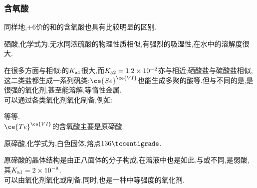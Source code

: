 \documentclass{ctexart}
\begin{document}
\subsubsection{含氧酸}
同样地,$+6$价的和的含氧酸也具有比较明显的区别.
\begin{substance}[\ce{H2SeO4}]
    硒酸,化学式为.无水同浓硫酸的物理性质相似,有强烈的吸湿性,在水中的溶解度很大.
\end{substance}
在很多方面与相似:的$K_{\text a1}$很大,而$K_{\text a2}=1.2\times10^{-2}$亦与相近;硒酸盐与硫酸盐相似,这二类盐都生成一系列矾类;$\ce{Se}^{\ce{VI}}$也能生成多聚的酸等.但与不同的是,是很强的氧化剂,甚至能溶解,等惰性金属.\\
\indent 可以通过各类氧化剂氧化制备,例如:
\begin{center}
\end{center}
等等.\\
\indent $\ce{Te}^{\ce{VI}}$的含氧酸主要是原碲酸.
\begin{substance}[\ce{H6TeO6}]
    原碲酸,化学式为,白色固体,熔点$136\tccentigrade$.
\end{substance}
原碲酸的晶体结构是由正八面体的分子构成,在溶液中也是如此.与或不同,是弱酸,其$K_{\text a1}=2\times10^{-8}$.\\
\indent {}可以由氧化剂氧化或制备.同时,也是一种中等强度的氧化剂.
\end{document}
